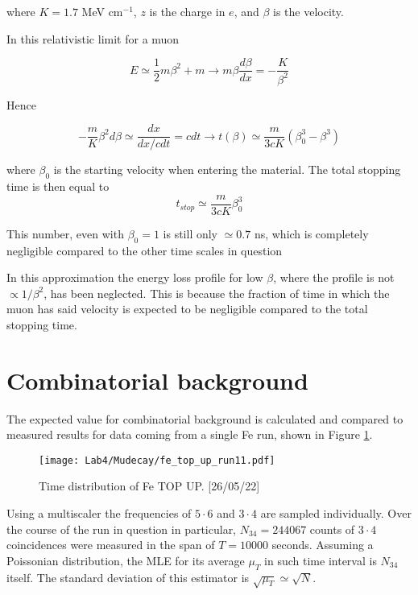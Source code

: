 \documentclass[10pt,a4paper,twocolumn]{article}
\begin{document}
\begin{appendices}
where $K=1.7$ MeV cm$^{-1}$, $z$ is the charge in $e$, and $\beta$ is the velocity.

In this relativistic limit for a muon

\begin{equation}
    E\simeq\frac{1}{2}m\beta^2+m   \longrightarrow m\beta \frac{d\beta}{dx}=-\frac{K}{\beta^2}  
\end{equation}

Hence

\begin{equation}
    -\frac{m}{K}\beta^2d\beta\simeq \frac{dx}{dx/cdt}=cdt   \longrightarrow t(\beta)\simeq\frac{m}{3cK}(\beta_0^3-\beta^3)
\end{equation}

where $\beta_0$ is the starting velocity when entering the material. The total stopping time is then equal to 
\begin{equation}
     t_{stop}\simeq\frac{m}{3cK}\beta_0^3
\end{equation}

This number, even with $\beta_0=1$ is still only $\simeq 0.7$ ns, which is completely negligible compared to the other time scales in question

In this approximation the energy loss profile for low $\beta$, where the profile is not $\propto 1/\beta^2$, has been neglected. This is because the fraction of time in which the muon has said velocity is expected to 
be negligible compared to the total stopping time.

\section{Combinatorial background}
\label{appendix:combinatorial}

The expected value for combinatorial background is calculated and compared to measured results for data coming from a single Fe run, shown in Figure \ref{Feruncomb}.

\begin{figure}[h!]
\centering
\caption{Time distribution of Fe TOP UP. [26/05/22]}
\texttt{[image: Lab4/Mudecay/fe\_top\_up\_run11.pdf]} 
\label{Feruncomb}
\end{figure}


Using a multiscaler the frequencies of $5\cdot 6$ and $3\cdot 4$ are sampled individually. Over the course of the run in question in particular, $N_{34}= 244067$ counts of $3\cdot 4$ coincidences were measured in the span of $T=10000$ seconds. Assuming a Poissonian distribution, the MLE for its average $\mu_T$ in such time interval is $N_{34}$ itself. The standard deviation of this estimator is $\sqrt{\mu_T}\simeq\sqrt{N}$.


\end{appendices}
\end{document}
